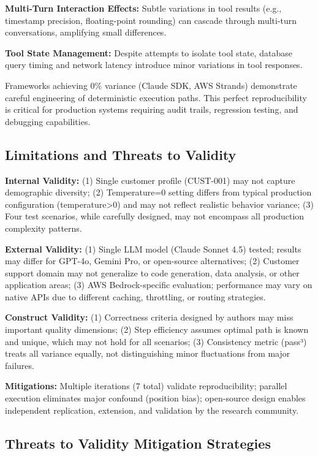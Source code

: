 \documentclass[sigconf,nonacm]{acmart}
\begin{document}
\textbf{Multi-Turn Interaction Effects:} Subtle variations in tool results (e.g., timestamp precision, floating-point rounding) can cascade through multi-turn conversations, amplifying small differences.

\textbf{Tool State Management:} Despite attempts to isolate tool state, database query timing and network latency introduce minor variations in tool responses.

Frameworks achieving 0\% variance (Claude SDK, AWS Strands) demonstrate careful engineering of deterministic execution paths. This perfect reproducibility is critical for production systems requiring audit trails, regression testing, and debugging capabilities.

\subsection{Limitations and Threats to Validity}

\textbf{Internal Validity:} (1) Single customer profile (CUST-001) may not capture demographic diversity; (2) Temperature=0 setting differs from typical production configuration (temperature>0) and may not reflect realistic behavior variance; (3) Four test scenarios, while carefully designed, may not encompass all production complexity patterns.

\textbf{External Validity:} (1) Single LLM model (Claude Sonnet 4.5) tested; results may differ for GPT-4o, Gemini Pro, or open-source alternatives; (2) Customer support domain may not generalize to code generation, data analysis, or other application areas; (3) AWS Bedrock-specific evaluation; performance may vary on native APIs due to different caching, throttling, or routing strategies.

\textbf{Construct Validity:} (1) Correctness criteria designed by authors may miss important quality dimensions; (2) Step efficiency assumes optimal path is known and unique, which may not hold for all scenarios; (3) Consistency metric (pass³) treats all variance equally, not distinguishing minor fluctuations from major failures.

\textbf{Mitigations:} Multiple iterations (7 total) validate reproducibility; parallel execution eliminates major confound (position bias); open-source design enables independent replication, extension, and validation by the research community.

\subsection{Threats to Validity Mitigation Strategies}
\end{document}
